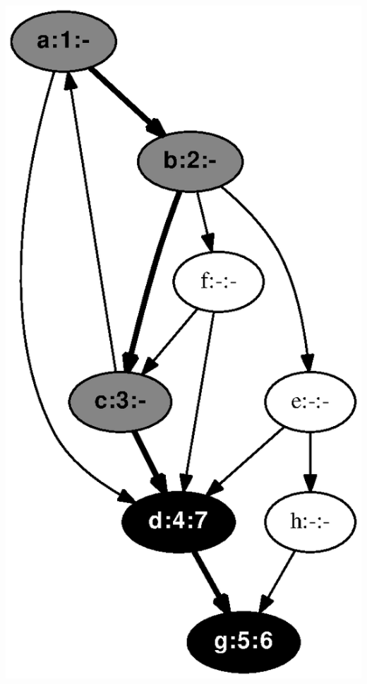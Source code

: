 \documentclass{article}
\begin{document}
\includegraphics[height=.3\textheight]{dfs_directed_classroom_07.eps}
\vspace{1em}
\end{document}
